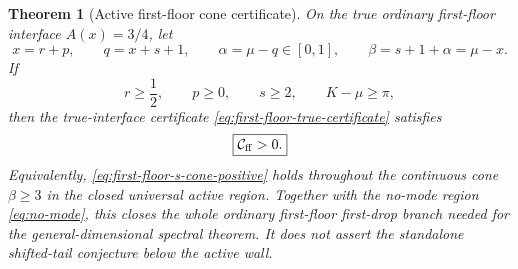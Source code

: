 \documentclass[11pt]{article}
\newtheorem{theorem}{Theorem}[section]
\theoremstyle{remark}
\begin{document}
\begin{theorem}[Active first-floor cone certificate]
\label{thm:first-floor-s-cone}
On the true ordinary first-floor interface $A(x)=3/4$, let
\[
 x=r+p,\qquad q=x+s+1,\qquad
 \alpha=\mu-q\in[0,1],\qquad
 \beta=s+1+\alpha=\mu-x.
\]
If
\begin{equation}
 r\geq\frac12,\qquad p\geq0,\qquad s\geq2,
 \qquad K-\mu\geq\pi,
 \label{eq:first-floor-s-cone-domain}
\end{equation}
then the true-interface certificate \eqref{eq:first-floor-true-certificate}
satisfies
\begin{equation}
 \boxed{\mathcal C_{\rm ff}>0.}
 \label{eq:first-floor-s-cone-positive}
\end{equation}
Equivalently, \eqref{eq:first-floor-s-cone-positive} holds throughout the
continuous cone $\beta\geq3$ in the closed universal active region.
Together with the no-mode region \eqref{eq:no-mode}, this closes the whole
ordinary first-floor first-drop branch needed for the general-dimensional spectral
theorem.  It does not assert the standalone shifted-tail conjecture below
the active wall.
\end{theorem}
\end{document}
